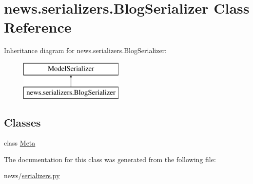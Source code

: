 \hypertarget{classnews_1_1serializers_1_1_blog_serializer}{}\section{news.\+serializers.\+Blog\+Serializer Class Reference}
\label{classnews_1_1serializers_1_1_blog_serializer}
Inheritance diagram for news.\+serializers.\+Blog\+Serializer\+:\begin{figure}[H]
\begin{center}
\leavevmode
\includegraphics[height=2.000000cm]{classnews_1_1serializers_1_1_blog_serializer}
\end{center}
\end{figure}
\subsection*{Classes}
\begin{DoxyCompactItemize}
\item 
class \mbox{\hyperlink{classnews_1_1serializers_1_1_blog_serializer_1_1_meta}{Meta}}
\end{DoxyCompactItemize}


The documentation for this class was generated from the following file\+:\begin{DoxyCompactItemize}
\item 
news/\mbox{\hyperlink{serializers_8py}{serializers.\+py}}\end{DoxyCompactItemize}
